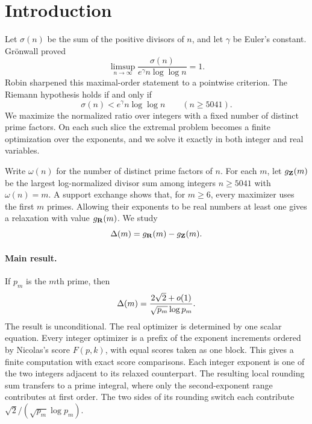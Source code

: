 \section{Introduction}
\label{s-introduction}

Let \(\sigma(n)\) be the sum of the positive divisors of \(n\), and let
\(\gamma\) be Euler's constant. Gr\"onwall \cite{gronwall1913} proved
\[
    \limsup_{n\to\infty}
    \frac{\sigma(n)}{e^\gamma n\log\log n}
    =
    1.
\]
Robin \cite{robin1984} sharpened this maximal-order statement to a
pointwise criterion. The Riemann hypothesis holds if and only if
\[
    \sigma(n)<e^\gamma n\log\log n
    \qquad (n\geq5041).
\]
We maximize the normalized ratio over integers with a fixed number of
distinct prime factors. On each such slice the extremal problem becomes
a finite optimization over the exponents, and we solve it exactly in
both integer and real variables.

Write \(\omega(n)\) for the number of distinct prime factors of \(n\).
For each \(m\), let \(g_{\mathbf{Z}}(m)\) be the largest log-normalized
divisor sum among integers \(n\geq5041\) with \(\omega(n)=m\). A support
exchange shows that, for \(m\geq6\), every maximizer uses the first \(m\)
primes. Allowing their exponents to be real numbers at least one gives a
relaxation with value \(g_{\mathbf{R}}(m)\). We study
\[
    \Delta(m)=g_{\mathbf{R}}(m)-g_{\mathbf{Z}}(m).
\]

\paragraph{Main result.}
If \(p_m\) is the \(m\)th prime, then
\begin{equation}
\label{e-integrality-gap-intro}
    \Delta(m)
    =
    \frac{2\sqrt2+o(1)}
         {\sqrt{p_m}\log p_m}.
\end{equation}
The result is unconditional. The real optimizer is determined by one
scalar equation. Every integer optimizer is a prefix of the exponent
increments ordered by Nicolas's score \(F(p,k)\), with equal scores
taken as one block. This gives a finite
computation with exact score comparisons. Each integer exponent is one of
the two integers adjacent to its relaxed counterpart. The resulting local
rounding sum transfers to a prime integral, where only the second-exponent
range contributes at first order. The two sides of its rounding switch
each contribute \(\sqrt2/(\sqrt{p_m}\log p_m)\).

